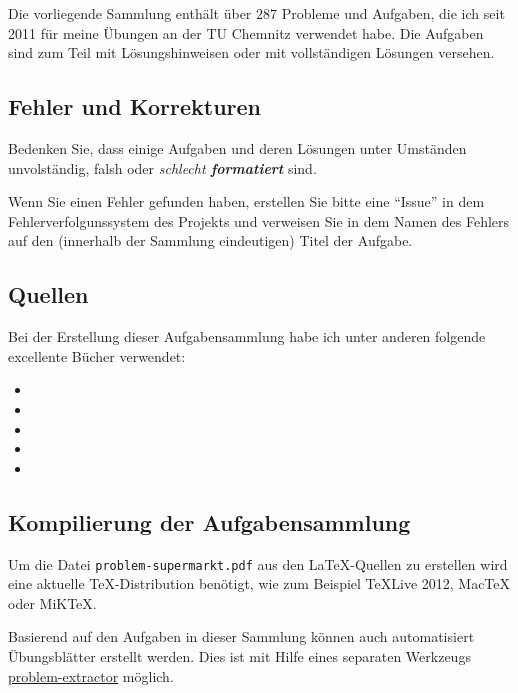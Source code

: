 
Die vorliegende Sammlung enthält über $287$ Probleme und Aufgaben, die ich seit
2011 für meine Übungen an der TU Chemnitz verwendet habe. Die Aufgaben sind zum
Teil mit Lösungshinweisen oder mit vollständigen Lösungen versehen. 

\subsection*{Fehler und Korrekturen}

Bedenken Sie, dass einige Aufgaben und deren Lösungen unter Umständen
unvolständig, falsh oder \emph{schlecht \textbf{formatiert}} sind. 

Wenn Sie einen Fehler gefunden haben, erstellen Sie bitte eine ``Issue'' in dem
Fehlerverfolgunssystem des Projekts und verweisen Sie in dem Namen des Fehlers
auf den (innerhalb der Sammlung eindeutigen) Titel der Aufgabe. 

\subsection*{Quellen}

Bei der Erstellung dieser Aufgabensammlung habe ich unter anderen folgende
excellente Bücher verwendet:

\begin{itemize}
    \item {}
    \item {}
    \item {}
    \item {}
    \item {}
\end{itemize}

\subsection*{Kompilierung der Aufgabensammlung} 

Um die Datei \texttt{problem-supermarkt.pdf} aus den \LaTeX{}-Quellen zu erstellen
wird eine aktuelle \TeX{}-Distribution benötigt, wie zum Beispiel \TeX{}Live 2012,
Mac\TeX{} oder MiK\TeX{}. 

Basierend auf den Aufgaben in dieser Sammlung können auch automatisiert 
Übungsblätter erstellt werden. Dies ist mit Hilfe eines separaten Werkzeugs 
\href{https://github.com/jwergieluk/problem-extractor}{problem-extractor}
möglich. 

